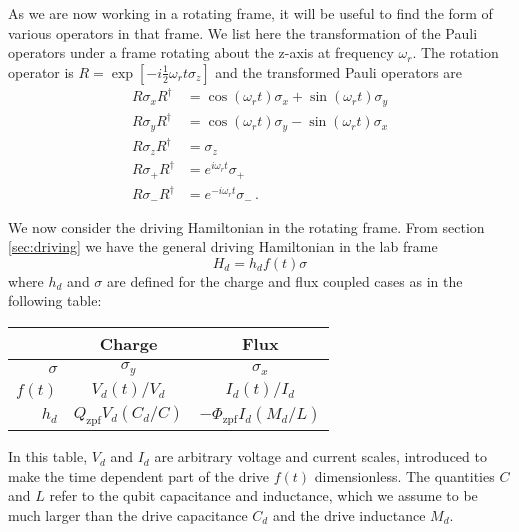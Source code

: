 
As we are now working in a rotating frame, it will be useful to find the form of various operators in that frame.
We list here the transformation of the Pauli operators under a frame rotating about the z-axis at frequency $\omega_r$.
The rotation operator is $R=\exp \left[-i \frac{1}{2} \omega_r t \sigma_z \right]$  and the transformed Pauli operators are
\begin{align*}
  R\sigma_xR^{\dagger} & = \cos(\omega_r t)\sigma_x + \sin(\omega_r t) \sigma_y \\
  R\sigma_yR^{\dagger} & = \cos(\omega_r t)\sigma_y - \sin(\omega_r t) \sigma_x \\
  R\sigma_zR^{\dagger} & = \sigma_z \\
  R\sigma_+R^{\dagger} & = e^{i\omega_r t}\sigma_+ \\
  R\sigma_-R^{\dagger} & = e^{-i\omega_r t}\sigma_- \, .
\end{align*}


We now consider the driving Hamiltonian in the rotating frame.
From section \ref{sec:driving} we have the general driving Hamiltonian in the lab frame
\begin{equation}
  H_d = h_d f(t) \sigma
\end{equation}
where $h_d$ and $\sigma$ are defined for the charge and flux coupled cases as in the following table:
\begin{center}
  \begin{tabular}{r|cc}
    \hline
    & \textbf{Charge} & \textbf{Flux} \\
    \hline
    $\sigma$ & $\sigma_y$ & $\sigma_x$ \\
    $f(t)$ & $V_d(t)/V_d$ & $I_d(t) / I_d$ \\
    $h_d$ & $Q_\text{zpf} V_d(C_d/C)$ & $-\Phi_\text{zpf} I_d (M_d/L)$ \\
    \hline
  \end{tabular}
\end{center}
In this table, $V_d$ and $I_d$ are arbitrary voltage and current scales, introduced to make the time dependent part of the drive $f(t)$ dimensionless.
The quantities $C$ and $L$ refer to the qubit capacitance and inductance, which we assume to be much larger than the drive capacitance $C_d$ and the drive inductance $M_d$.


